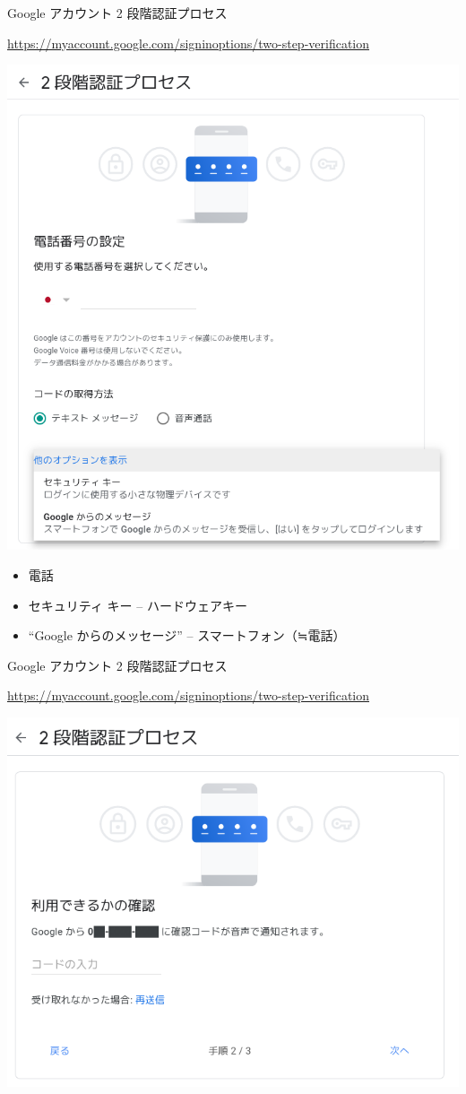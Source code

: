\begin{frame}{Google アカウント 2 段階認証プロセス}

{\footnotesize\url{https://myaccount.google.com/signinoptions/two-step-verification}}

\begin{center}
\includegraphics[width=0.45\hsize]{image202205/g-signinopt-twostepverif-enroll-1-1.png}
\end{center}

\begin{itemize}
 \item 電話
 \item セキュリティ キー -- ハードウェアキー
 \item ``Google からのメッセージ'' -- スマートフォン（≒電話）
\end{itemize}

\end{frame}

\begin{frame}{Google アカウント 2 段階認証プロセス}

{\footnotesize\url{https://myaccount.google.com/signinoptions/two-step-verification}}

\begin{center}
\includegraphics[width=0.5\hsize]{image202205/g-signinopt-twostepverif-enroll-2.png}
\end{center}

\begin{quote}
\end{quote}

\end{frame}

